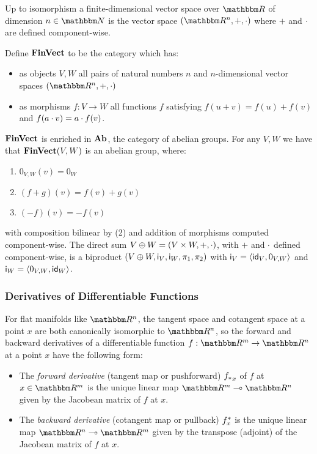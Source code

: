 Up to isomorphism a finite-dimensional vector space over $\RR$ of dimension $n \in \Nat$ is the vector space
$(\RR^n, +, \mult)$ where $+$ and $\cdot$ are defined component-wise.

\begin{definition}
Define $\mathbf{FinVect}$ to be the category which has:
\begin{itemize}
\item as objects $V, W$ all pairs of natural numbers $n$ and $n$-dimensional vector spaces $(\RR^n, +, \mult)$
\item as morphisms $f: V \to W$ all functions $f$ satisfying $f(u + v) = f(u) + f(v)$ and $f(a \cdot v) = a
\cdot f(v)$.
\end{itemize}
\end{definition}

$\mathbf{FinVect}$ is enriched in $\mathbf{Ab}$, the category of abelian groups. For any $V, W$ we have that $\mathbf{FinVect}(V,W)$
is an abelian group, where:
\begin{enumerate}
\item $0_{V,W}(v) = 0_W$
\item $(f + g)(v) = f(v) + g(v)$
\item $(-f)(v) = -f(v)$
\end{enumerate}
\noindent with composition bilinear by (2) and addition of morphisms computed component-wise. The direct sum
$V \oplus W = (V \times W, +, \cdot)$, with $+$ and $\cdot$ defined component-wise, is a biproduct $(V
\oplus W, \mathsf{i}_V, \mathsf{i}_W, \pi_1, \pi_2)$ with $\mathsf{i}_V = \langle \mathsf{id}_V, 0_{V,W}\rangle$ and $\mathsf{i}_W =
\langle 0_{V,W}, \mathsf{id}_W\rangle$.

\subsubsection{Derivatives of Differentiable Functions}

For flat manifolds like $\RR^n$, the tangent space and cotangent space at a point $x$ are both canonically
isomorphic to $\RR^n$, so the forward and backward derivatives of a differentiable function $f: \RR^m \to
\RR^n$ at a point $x$ have the following form:

\begin{itemize}
\item The \emph{forward derivative} (tangent map or pushforward) ${f_{*}}_x$ of $f$ at $x \in \RR^m$ is the
unique linear map $\RR^m \linearto \RR^n$ given by the Jacobean matrix of $f$ at $x$.
\item The \emph{backward derivative} (cotangent map or pullback) $f^{*}_x$ is the unique linear map
$\RR^n \linearto \RR^m$ given by the transpose (adjoint) of the Jacobean matrix of $f$ at $x$.
\end{itemize}

